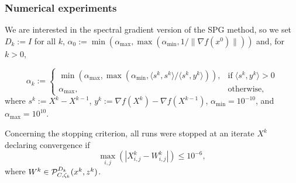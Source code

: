 \documentclass[xcolor=dvipsnames,aspectratio=169,13pt]{beamer} %
\begin{document}
\begin{frame}[t]\frametitle{Numerical experiments}

We are interested in the \textcolor{UFGred}{spectral gradient version of the SPG method}, so we set $D_k:=I$ for all $k$, $\alpha_0 := \min(\alpha_{\max}, \max(\alpha_{\min}, 1/ \| \nabla f(x^0) \|))$ and, for $k>0$,

\begin{equation*}
\alpha_k:=\left\{
  \begin{array}{ll}
    \displaystyle\min (\alpha_{\max},\max (\alpha_{\min},\langle s^k,s^k\rangle/\langle s^k,y^k\rangle)), & \mbox{if} \; \langle s^k,y^k\rangle > 0\\
    \alpha_{\max}, & \mbox{otherwise},
  \end{array}\right.
\end{equation*}
where $s^k:=X^k - X^{k-1}$, $y^k:=\nabla f(X^k) - \nabla f(X^{k-1})$, $\alpha_{\min}=10^{-10}$, and $\alpha_{\max}=10^{10}$.


Concerning the stopping criterion, all runs were stopped at an iterate $X^k$ declaring convergence if
$$\displaystyle \max_{i,j} (|X^k_{i,j}-W^k_{i,j}| )\leq 10^{-6},$$ 
where $W^k \in {\cal P}_{C, \zeta_k}^{D_k}(x^{k}, z^k)$.
\end{frame}
\end{document}

